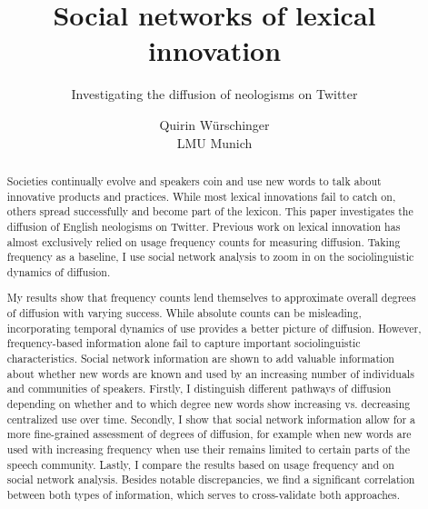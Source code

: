 \documentclass[
  a4paper,
  abstract=on,
  captions=tableabove
  ]{scrartcl}
\begin{document}


  \title{Social networks of lexical innovation}
  \subtitle{Investigating the diffusion of neologisms on Twitter}
  \author{Quirin Würschinger\\ LMU Munich}
  \maketitle


\listoftodos

  \cleardoublepage

  \begin{abstract}

    Societies continually evolve and speakers coin and use new words to talk about innovative products and practices. While most lexical innovations fail to catch on, others spread successfully and become part of the lexicon. This paper investigates the diffusion of English neologisms on Twitter. Previous work on lexical innovation has almost exclusively relied on usage frequency counts for measuring diffusion. Taking frequency as a baseline, I use social network analysis to zoom in on the sociolinguistic dynamics of diffusion.

    My results show that frequency counts lend themselves to approximate overall degrees of diffusion with varying success. While absolute counts can be misleading, incorporating temporal dynamics of use provides a better picture of diffusion. However, frequency-based information alone fail to capture important sociolinguistic characteristics. Social network information are shown to add valuable information about whether new words are known and used by an increasing number of individuals and communities of speakers. Firstly, I distinguish different pathways of diffusion depending on whether and to which degree new words show increasing vs. decreasing centralized use over time. Secondly, I show that social network information allow for a more fine-grained assessment of degrees of diffusion, for example when new words are used with increasing frequency when use their remains limited to certain parts of the speech community. Lastly, I compare the results based on usage frequency and on social network analysis. Besides notable discrepancies, we find a significant correlation between both types of information, which serves to cross-validate both approaches.


\end{abstract}
\end{document}
